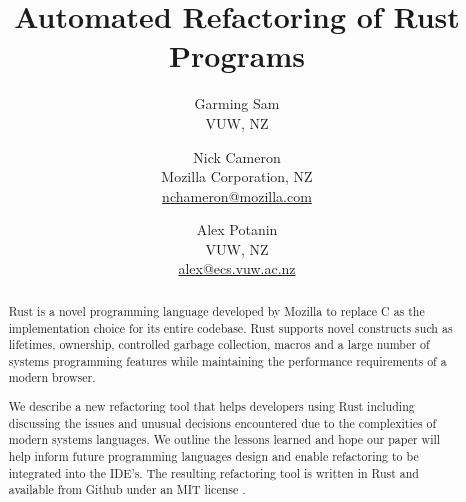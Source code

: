 \documentclass{sig-alternate-05-2015}
\begin{document}
\title{Automated Refactoring of Rust Programs}

\author{Garming Sam\\ VUW, NZ \and Nick Cameron\\ Mozilla Corporation, NZ\\ \url{nchameron@mozilla.com} \and Alex Potanin\\ VUW, NZ\\ \url{alex@ecs.vuw.ac.nz}}

\maketitle

\begin{abstract}
Rust is a novel programming language developed by Mozilla to replace C as the implementation choice for its entire codebase. Rust supports novel constructs such as lifetimes, ownership, controlled garbage collection, macros and a large number of systems programming features while maintaining the performance requirements of a modern browser.

We describe a new refactoring tool that helps developers using Rust including discussing the issues and unusual decisions encountered due to the complexities of modern systems languages. We outline the lessons learned and hope our paper will help inform future programming languages design and enable refactoring to be integrated into the IDE's. The resulting refactoring tool is written in Rust and available from Github under an MIT license \cite{rrproject}.
\end{abstract}











\end{document}
